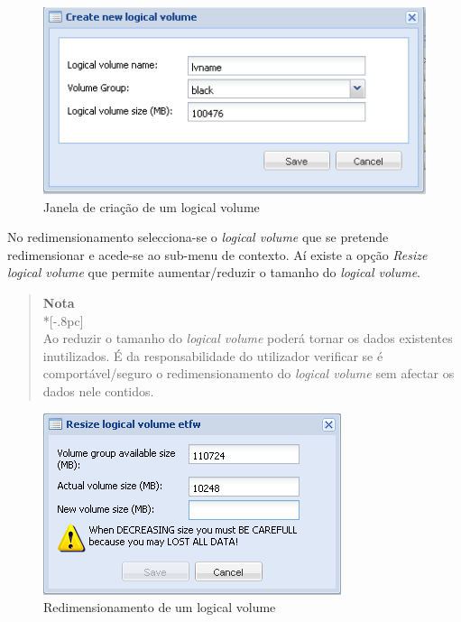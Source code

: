 \begin{figure}[H]
        \begin{center}
        \includegraphics[scale=0.5]{screenshots/storage_lv_create.png}
        \caption{Janela de criação de um logical volume}
        \label{fig:storage_lv_create}
        \end{center}
\end{figure}

No redimensionamento selecciona-se o \emph{logical volume} que se pretende redimensionar e acede-se ao sub-menu de contexto. Aí existe a opção \emph{Resize logical volume} que permite aumentar/reduzir o tamanho do \emph{logical volume}.


\begin{quote}
	{\large \bf Nota} \\*[-.8pc]
	\underline{\hspace{6in}} \\
	Ao reduzir o tamanho do \emph{logical volume} poderá tornar os dados existentes inutilizados. É da responsabilidade do utilizador verificar se é comportável/seguro o redimensionamento do \emph{logical volume} sem afectar os dados nele contidos.
\end{quote}


\begin{figure}[H]
        \begin{center}
        \includegraphics[scale=0.5]{screenshots/storage_lv_resize.png}
        \caption{Redimensionamento de um logical volume}
        \label{fig:storage_lv_resize}
        \end{center}
\end{figure}


